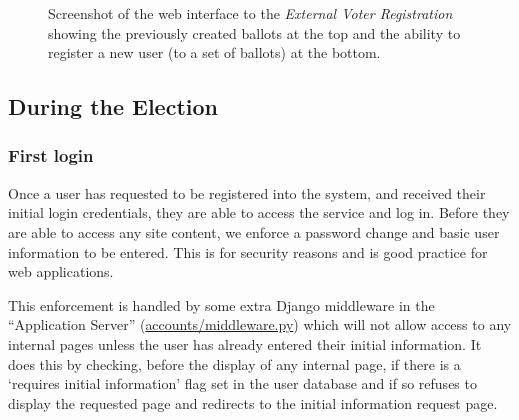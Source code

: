 \documentclass{article}
\begin{document}
\begin{figure}[h]
	\noindent
	\vspace{-0.5cm}
	\caption{Screenshot of the web interface to the \textit{External Voter Registration} showing the previously created ballots at the top and the ability to register a new user (to a set of ballots) at the bottom.}
\end{figure}


\clearpage
\subsection{During the Election}
\subsubsection{First login}
Once a user has requested to be registered into the system, and received their initial login credentials, they are able to access the service and log in. Before they are able to access any site content, we enforce a password change and basic user information to be entered. This is for security reasons and is good practice for web applications.

This enforcement is handled by some extra Django middleware in the ``Application Server'' (\href{https://github.com/Mattie432/Blockchain-Voting-System/blob/master/Programming/2_ApplicationServer/accounts/middleware.py}{accounts/middleware.py}) which will not allow access to any internal pages unless the user has already entered their initial information. It does this by checking, before the display of any internal page, if there is a `requires initial information' flag set in the user database and if so refuses to display the requested page and redirects to the initial information request page.
\end{document}
